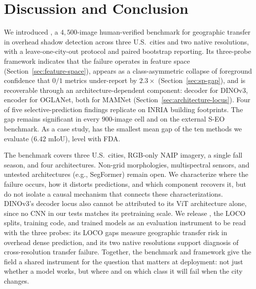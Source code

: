\section{Discussion and Conclusion}
\label{sec:conclusion}

We introduced \shadow, a $4{,}500$-image human-verified benchmark for geographic transfer in overhead shadow detection across three U.S.\ cities and two native resolutions, with a leave-one-city-out protocol and paired bootstrap reporting. Its three-probe framework indicates that the failure operates in feature space (Section~\ref{sec:feature-space}), appears as a class-asymmetric collapse of foreground confidence that $0/1$ metrics under-report by $2.3\times$ (Section~\ref{sec:sp-gap}), and is recoverable through an architecture-dependent component: decoder for DINOv3, encoder for OGLANet, both for MAMNet (Section~\ref{sec:architecture-locus}). Four of five selective-prediction findings replicate on INRIA building footprints. The gap remains significant in every $900$-image cell and on the external S-EO benchmark. As a case study, \sib{} has the smallest mean gap of the ten methods we evaluate ($6.42$ mIoU), level with FDA.

The benchmark covers three U.S.\ cities, RGB-only NAIP imagery, a single fall season, and four architectures. Non-grid morphologies, multispectral sensors, and untested architectures (e.g., SegFormer) remain open. We characterize where the failure occurs, how it distorts predictions, and which component recovers it, but do not isolate a causal mechanism that connects these characterizations. DINOv3's decoder locus also cannot be attributed to its ViT architecture alone, since no CNN in our tests matches its pretraining scale. We release \shadow, the LOCO splits, training code, and trained models as an evaluation instrument to be read with the three probes: its LOCO gaps measure geographic transfer risk in overhead dense prediction, and its two native resolutions support diagnosis of cross-resolution transfer failure. Together, the benchmark and framework give the field a shared instrument for the question that matters at deployment: not just whether a model works, but where and on which class it will fail when the city changes.

